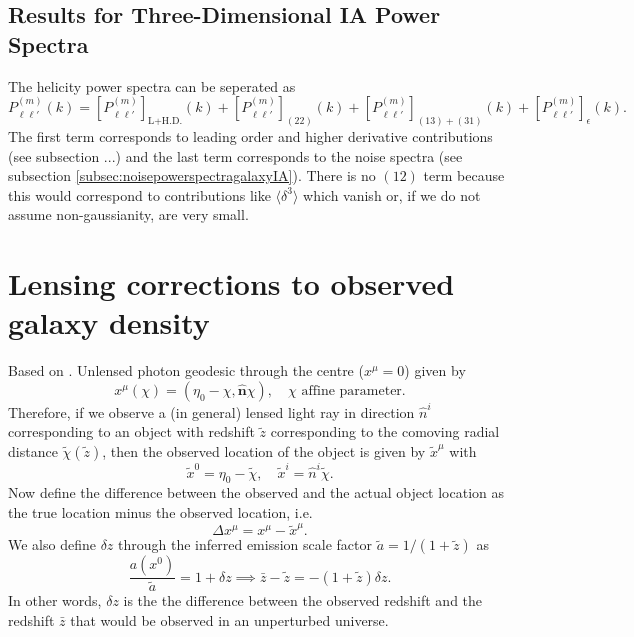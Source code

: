 \documentclass[11pt]{article}
\begin{document}
\subsection{Results for Three-Dimensional IA Power Spectra}
The helicity power spectra can be seperated as
\begin{equation}
    P_{\ell \ell'}^{(m)}(k) = [P^{(m)}_{\ell\ell'}]_{\text{L+H.D.}}(k) + [P^{(m)}_{\ell\ell'}]_{(22)}(k) + [P^{(m)}_{\ell\ell'}]_{(13) + (31)}(k) + [P^{(m)}_{\ell\ell'}]_{\epsilon}(k).
\end{equation}
The first term corresponds to leading order and higher derivative contributions (see subsection ...) %
and the last term corresponds to the noise spectra (see subsection \ref{subsec:noisepowerspectragalaxyIA}). There is no $(12)$ term because this would correspond to contributions like $\langle \delta^3 \rangle$ which vanish or, if we do not assume non-gaussianity, are very small.
\section{Lensing corrections to observed galaxy density}
Based on \cite{Schmidt2013_clustering}. Unlensed photon geodesic through the centre ($x^\mu = 0$) given by
$$
x^\mu(\chi) = (\eta_0-\chi, \hat{\mathbf n}\chi), \quad \chi \text{ affine parameter.}
$$
Therefore, if we observe a (in general) lensed light ray in direction $\hat n^i$ corresponding to an object with redshift $\tilde z$ corresponding to the comoving radial distance $\tilde \chi(\tilde z)$, then the observed location of the object is given by $\tilde x^\mu$ with
\begin{equation}
    \tilde x^0 = \eta_0 - \tilde \chi, \quad \tilde x^i = \hat n^i \tilde \chi.
\end{equation}
Now define the difference between the observed and the actual object location as the true location minus the observed location, i.e.
\begin{equation}
    \Delta x^\mu = x^{\mu} - \tilde x^\mu.
\end{equation}
We also define $\delta z$ through the inferred emission scale factor $\tilde a = 1/(1+\tilde z)$ as
\begin{equation}
    \frac{a(x^0)}{\tilde a} = 1+\delta z \implies \bar z - \tilde z = -(1+\tilde z)\delta z.
\end{equation}
In other words, $\delta z$ is the the difference between the observed redshift and the redshift $\bar z$ that would be observed in an unperturbed universe.
\end{document}
